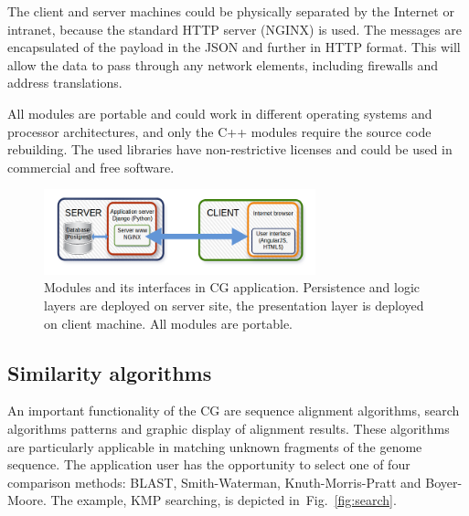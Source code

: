 \documentclass[]{spie}
\newcommand{\appShortcut}{CG}
\begin{document}
The client and server machines could be physically separated by the Internet or intranet,
because the standard HTTP server (NGINX) is used.
The messages are encapsulated of the payload in the JSON and further in HTTP format.
This will allow the data to pass through any network elements, including firewalls and address translations.

All modules are portable and could work in different operating systems and processor architectures, and only the C++ modules require the source code rebuilding.
The used libraries have non-restrictive licenses and could be used in commercial and free software.

\begin{figure}[htp]
  \centering
  \includegraphics[width=0.7\textwidth]{img/ogolny_schemat_en.png}
  \caption{Modules and its interfaces in \appShortcut{} application.
    Persistence and logic layers are deployed on server site, the presentation layer is deployed on client machine.
    All modules are portable.}
  \label{fig:architecture}
\end{figure}

\subsection{Similarity algorithms}

An important functionality of the \appShortcut{} are sequence alignment algorithms, search algorithms patterns and graphic display of alignment results.
These algorithms are particularly  applicable in matching unknown fragments of the genome sequence.
The application user has the opportunity to select one of four comparison methods: BLAST, Smith-Waterman, Knuth-Morris-Pratt and Boyer-Moore.
The example, KMP searching, is depicted in~Fig.~\ref{fig:search}.
\end{document}
